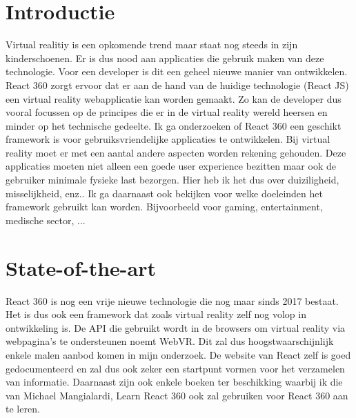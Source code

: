 
\section{Introductie} %
\label{sec:introductie}

Virtual realitiy is een opkomende trend maar staat nog steeds in zijn kinderschoenen. Er is dus nood aan applicaties die gebruik maken van deze technologie. Voor een developer is dit een geheel nieuwe manier van ontwikkelen. React 360 zorgt ervoor dat er aan de hand van de huidige technologie (React JS) een virtual reality webapplicatie kan worden gemaakt. Zo kan de developer dus vooral focussen op de principes die er in de virtual reality wereld heersen en minder op het technische gedeelte. Ik ga onderzoeken of React 360 een geschikt framework is voor gebruiksvriendelijke applicaties te ontwikkelen. Bij virtual reality moet er met een aantal andere aspecten worden rekening gehouden. Deze applicaties moeten niet alleen een goede user experience bezitten maar ook de gebruiker minimale fysieke last bezorgen. Hier heb ik het dus over duiziligheid, misselijkheid, enz.. Ik ga daarnaast ook bekijken voor welke doeleinden het framework gebruikt kan worden. Bijvoorbeeld voor gaming, entertainment, medische sector, ...


\section{State-of-the-art}
\label{sec:state-of-the-art}

React 360 is nog een vrije nieuwe technologie die nog maar sinds 2017 bestaat. Het is dus ook een framework dat zoals virtual reality zelf nog volop in ontwikkeling is. De API die gebruikt wordt in de browsers om virtual reality via webpagina's te ondersteunen noemt WebVR. Dit zal dus hoogstwaarschijnlijk enkele malen aanbod komen in mijn onderzoek. De website van React zelf is goed gedocumenteerd en zal dus ook zeker een startpunt vormen voor het verzamelen van informatie. Daarnaast zijn ook enkele boeken ter beschikking waarbij ik die van Michael Mangialardi, Learn React 360 \autocite{Mangialardi2017} ook zal gebruiken voor React 360 aan te leren.

